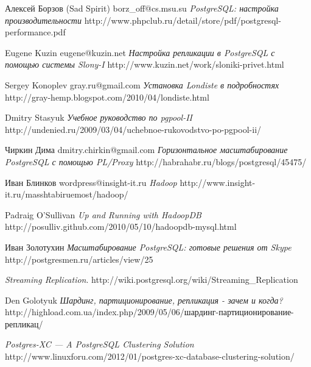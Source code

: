 \renewcommand\bibname{Литература}

\begin{thebibliography}{9}

  Алексей Борзов (Sad Spirit) borz\_off@cs.msu.su
  \emph{PostgreSQL: настройка производительности}
  http://www.phpclub.ru/detail/store/pdf/postgresql-performance.pdf
  
  Eugene Kuzin eugene@kuzin.net
  \emph{Настройка репликации в PostgreSQL с помощью системы Slony-I}
  http://www.kuzin.net/work/sloniki-privet.html
  
  Sergey Konoplev gray.ru@gmail.com
  \emph{Установка Londiste в подробностях}
  http://gray-hemp.blogspot.com/2010/04/londiste.html

  Dmitry Stasyuk
  \emph{Учебное руководство по pgpool-II}
  http://undenied.ru/2009/03/04/uchebnoe-rukovodstvo-po-pgpool-ii/
  
  Чиркин Дима dmitry.chirkin@gmail.com
  \emph{Горизонтальное масштабирование PostgreSQL с помощью PL/Proxy}
  http://habrahabr.ru/blogs/postgresql/45475/
  
  Иван Блинков wordpress@insight-it.ru
  \emph{Hadoop}
  http://www.insight-it.ru/masshtabiruemost/hadoop/

  Padraig O'Sullivan
  \emph{Up and Running with HadoopDB}
  http://posulliv.github.com/2010/05/10/hadoopdb-mysql.html
  
  Иван Золотухин
  \emph{Масштабирование PostgreSQL: готовые решения от Skype}
  http://postgresmen.ru/articles/view/25

  \emph{Streaming Replication}.
  http://wiki.postgresql.org/wiki/Streaming\_Replication
  
  Den Golotyuk
  \emph{Шардинг, партиционирование, репликация - зачем и когда?}
  http://highload.com.ua/index.php/2009/05/06/шардинг-партиционирование-репликац/
  
  \emph{Postgres-XC — A PostgreSQL Clustering Solution}
  http://www.linuxforu.com/2012/01/postgres-xc-database-clustering-solution/

\end{thebibliography}